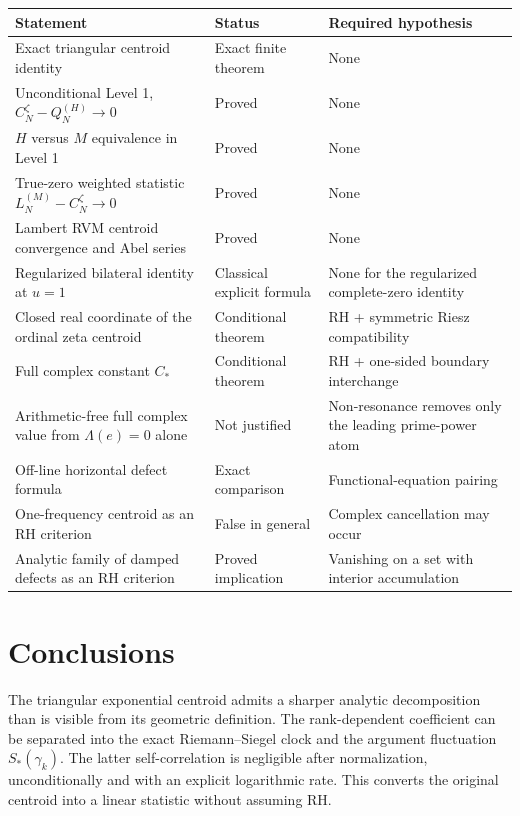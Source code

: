 \documentclass[11pt]{amsart}
\numberwithin{equation}{section}
\theoremstyle{definition}
\theoremstyle{remark}
\begin{document}
\begin{center}
\small\begin{tabular}{@{}p{}p{}p{}@{}}
\toprule
Statement & Status & Required hypothesis \\
\midrule
Exact triangular centroid identity & Exact finite theorem & None \\
Unconditional Level 1, $C_N^{\zeta}-Q_N^{(H)}\to0$ & Proved & None \\
$H$ versus $M$ equivalence in Level 1 & Proved & None \\
True-zero weighted statistic $L_N^{(M)}-C_N^{\zeta}\to0$ & Proved & None \\
Lambert RVM centroid convergence and Abel series & Proved & None \\
Regularized bilateral identity at $u=1$ & Classical explicit formula & None for the regularized complete-zero identity \\
Closed real coordinate of the ordinal zeta centroid & Conditional theorem & RH + symmetric Riesz compatibility \\
Full complex constant $C_*$ & Conditional theorem & RH + one-sided boundary interchange \\
Arithmetic-free full complex value from $\Lambda(e)=0$ alone & Not justified & Non-resonance removes only the leading prime-power atom \\
Off-line horizontal defect formula & Exact comparison & Functional-equation pairing \\
One-frequency centroid as an RH criterion & False in general & Complex cancellation may occur \\
Analytic family of damped defects as an RH criterion & Proved implication & Vanishing on a set with interior accumulation \\
\bottomrule
\end{tabular}
\end{center}

\section{Conclusions}\label{sec:conclusions}

The triangular exponential centroid admits a sharper analytic decomposition than is visible from its geometric definition.  The rank-dependent coefficient can be separated into the exact Riemann--Siegel clock and the argument fluctuation $S_*(\gamma_k)$.  The latter self-correlation is negligible after normalization, unconditionally and with an explicit logarithmic rate.  This converts the original centroid into a linear statistic without assuming RH.
\end{document}
